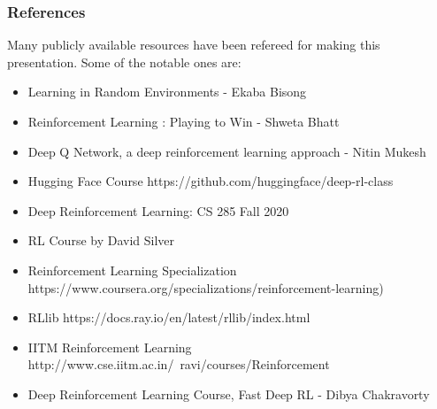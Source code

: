 \begin{frame}\frametitle{References}
Many publicly available resources have been refereed for making this presentation. Some of the notable ones are:
\footnotesize
\begin{itemize}
\item Learning in Random Environments - Ekaba Bisong
\item Reinforcement Learning : Playing to Win - Shweta Bhatt
\item Deep Q Network, a deep reinforcement learning approach - Nitin Mukesh
\item Hugging Face Course https://github.com/huggingface/deep-rl-class
\item Deep Reinforcement Learning: CS 285 Fall 2020
\item RL Course by David Silver
\item Reinforcement Learning Specialization https://www.coursera.org/specializations/reinforcement-learning)
\item RLlib https://docs.ray.io/en/latest/rllib/index.html
\item IITM Reinforcement Learning http://www.cse.iitm.ac.in/~ravi/courses/Reinforcement%
\item Deep Reinforcement Learning Course, Fast Deep RL - Dibya Chakravorty
\end{itemize}
\end{frame}
